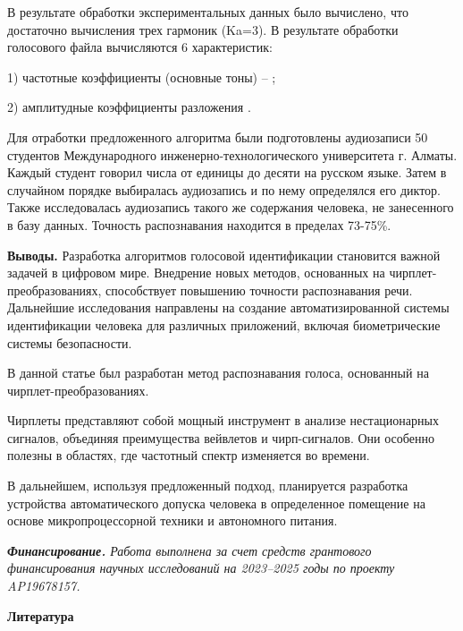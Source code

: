 \begin{multicols}{2}
В результате обработки экспериментальных данных было вычислено, что
достаточно вычисления трех гармоник (Ka=3). В результате обработки
голосового файла вычисляются 6 характеристик:

1) частотные коэффициенты (основные тоны) --
;

2) амплитудные коэффициенты разложения
.

Для отработки предложенного алгоритма были подготовлены аудиозаписи 50
студентов Международного инженерно-технологического университета г.
Алматы. Каждый студент говорил числа от единицы до десяти на русском
языке. Затем в случайном порядке выбиралась аудиозапись и по нему
определялся его диктор. Также исследовалась аудиозапись такого же
содержания человека, не занесенного в базу данных. Точность
распознавания находится в пределах 73-75\%.

{\bfseries Выводы.} Разработка алгоритмов голосовой идентификации
становится важной задачей в цифровом мире. Внедрение новых методов,
основанных на чирплет-преобразованиях, способствует повышению точности
распознавания речи. Дальнейшие исследования направлены на создание
автоматизированной системы идентификации человека для различных
приложений, включая биометрические системы безопасности.

В данной статье был разработан метод распознавания голоса, основанный на
чирплет-преобразованиях.

Чирплеты представляют собой мощный инструмент в анализе нестационарных
сигналов, объединяя преимущества вейвлетов и чирп-сигналов. Они особенно
полезны в областях, где частотный спектр изменяется во времени.

В дальнейшем, используя предложенный подход, планируется разработка
устройства автоматического допуска человека в определенное помещение на
основе микропроцессорной техники и автономного питания.

\emph{{\bfseries Финансирование.} Работа выполнена за счет средств
грантового финансирования научных исследований на 2023--2025 годы по
проекту AP19678157.}
\end{multicols}

\begin{center}
{\bfseries Литература}
\end{center}

